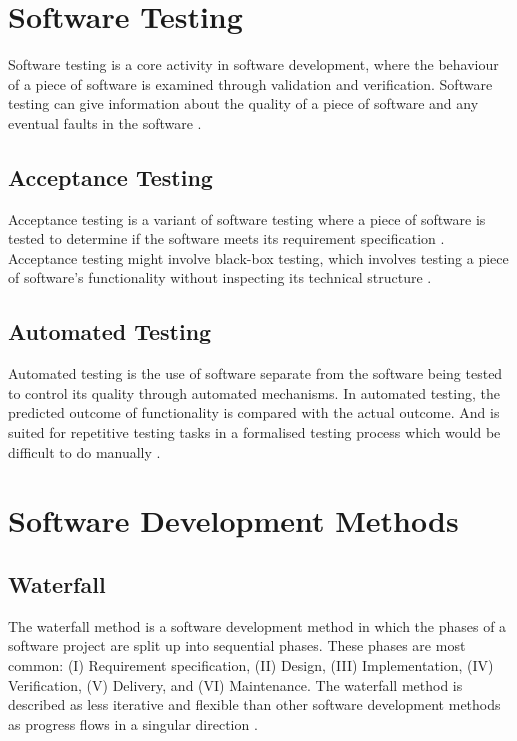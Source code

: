 \section{Software Testing}
Software testing is a core activity in software development, where the behaviour of a piece of software is examined through validation and verification. Software testing can give information about the quality of a piece of software and any eventual faults in the software \cite{software_testing_wiki_2023}.

\subsection{Acceptance Testing}
Acceptance testing is a variant of software testing where a piece of software is tested to determine if the software meets its requirement specification \cite{acceptance_testing_wiki_2023}. Acceptance testing might involve black-box testing, which involves testing a piece of software's functionality without inspecting its technical structure \cite{black_box_testing_wiki_2023}.

\subsection{Automated Testing}
Automated testing is the use of software separate from the software being tested to control its quality through automated mechanisms. In automated testing, the predicted outcome of functionality is compared with the actual outcome. And is suited for repetitive testing tasks in a formalised testing process which would be difficult to do manually \cite{test_automation_wiki_2023}.

\section{Software Development Methods}
\subsection{Waterfall}
The waterfall method is a software development method in which the phases of a software project are split up into sequential phases. These phases are most common: (I) Requirement specification, (II) Design, (III) Implementation, (IV) Verification, (V) Delivery, and (VI) Maintenance. The waterfall method is described as less iterative and flexible than other software development methods as progress flows in a singular direction \cite{waterfall_model_wiki_2023}.

